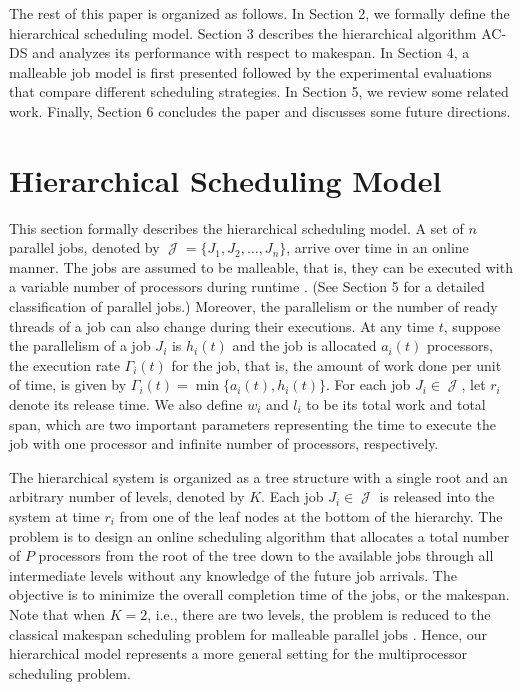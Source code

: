 \documentclass[10pt, a4paper]{article}
\newcommand{\calset}[1]{\ensuremath{\mathop{\mathcal{#1}}\nolimits}}
\newcommand{\jobset}{\calset{J}}
\begin{document}
The rest of this paper is organized as follows. In Section 2, we formally define the hierarchical
scheduling model. Section 3 describes the hierarchical algorithm AC-DS and analyzes its performance
with respect to makespan. In Section 4, a malleable job model is first presented followed by the
experimental evaluations that compare different scheduling strategies. In Section 5, we review some
related work. Finally, Section 6 concludes the paper and discusses some future directions.

\section{Hierarchical Scheduling Model}

This section formally describes the hierarchical scheduling model. A set of $n$ parallel jobs,
denoted by $\jobset = \{J_1, J_2, \ldots, J_n\}$, arrive over time in an online manner. The jobs
are assumed to be malleable, that is, they can be executed with a variable number of processors
during runtime \cite{FeitelsonRu98}. (See Section 5 for a detailed classification of parallel
jobs.) Moreover, the parallelism or the number of ready threads of a job can also change during
their executions. At any time $t$, suppose the parallelism of a job $J_i$ is $h_i(t)$ and the job
is allocated $a_i(t)$ processors, the execution rate $\Gamma_i(t)$ for the job, that is, the amount
of work done per unit of time, is given by $\Gamma_i(t) = \min\{a_i(t), h_i(t)\}$. For each job
$J_i\in \jobset$, let $r_i$ denote its release time. We also define $w_i$ and $l_i$ to be its total
work and total span, which are two important parameters representing the time to execute the job
with one processor and infinite number of processors, respectively.

The hierarchical system is organized as a tree structure with a single root and an arbitrary number
of levels, denoted by $K$. Each job $J_i \in \jobset$ is released into the system at time $r_i$
from one of the leaf nodes at the bottom of the hierarchy. The problem is to design an online
scheduling algorithm that allocates a total number of $P$ processors from the root of the tree down
to the available jobs through all intermediate levels without any knowledge of the future job
arrivals. The objective is to minimize the overall completion time of the jobs, or the makespan.
Note that when $K = 2$, i.e., there are two levels, the problem is reduced to the classical
makespan scheduling problem for malleable parallel jobs
\cite{HeHsLe06,SunCaHs11,AgrawalHeHs06,SunHs08}. Hence, our hierarchical model represents a more
general setting for the multiprocessor scheduling problem.
\end{document}
